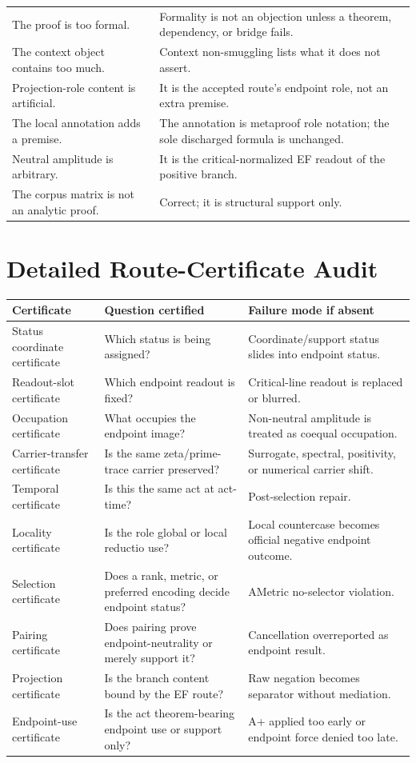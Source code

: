 \documentclass[11pt]{article}
\begin{document}
\begin{longtable}{L{0.35\textwidth}L{0.55\textwidth}}
The proof is too formal. & Formality is not an objection unless a theorem, dependency, or bridge fails.\\
The context object contains too much. & Context non-smuggling lists what it does not assert.\\
Projection-role content is artificial. & It is the accepted route's endpoint role, not an extra premise.\\
The local annotation adds a premise. & The annotation is metaproof role notation; the sole discharged formula is unchanged.\\
Neutral amplitude is arbitrary. & It is the critical-normalized EF readout of the positive branch.\\
The corpus matrix is not an analytic proof. & Correct; it is structural support only.\\
\bottomrule
\end{longtable}
\endgroup

\section{Detailed Route-Certificate Audit}\label{app:route-certificates}

\begingroup\small
\begin{longtable}{L{0.28\textwidth}L{0.35\textwidth}L{0.27\textwidth}}
\toprule
\textbf{Certificate} & \textbf{Question certified} & \textbf{Failure mode if absent}\\
\midrule
Status coordinate certificate & Which status is being assigned? & Coordinate/support status slides into endpoint status.\\
Readout-slot certificate & Which endpoint readout is fixed? & Critical-line readout is replaced or blurred.\\
Occupation certificate & What occupies the endpoint image? & Non-neutral amplitude is treated as coequal occupation.\\
Carrier-transfer certificate & Is the same zeta/prime-trace carrier preserved? & Surrogate, spectral, positivity, or numerical carrier shift.\\
Temporal certificate & Is this the same act at act-time? & Post-selection repair.\\
Locality certificate & Is the role global or local reductio use? & Local countercase becomes official negative endpoint outcome.\\
Selection certificate & Does a rank, metric, or preferred encoding decide endpoint status? & AMetric no-selector violation.\\
Pairing certificate & Does pairing prove endpoint-neutrality or merely support it? & Cancellation overreported as endpoint result.\\
Projection certificate & Is the branch content bound by the EF route? & Raw negation becomes separator without mediation.\\
Endpoint-use certificate & Is the act theorem-bearing endpoint use or support only? & A+ applied too early or endpoint force denied too late.\\
\bottomrule
\end{longtable}
\endgroup
\end{document}
